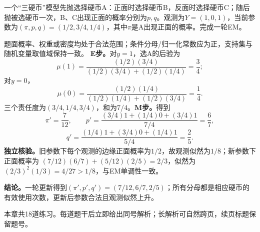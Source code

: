 \label{struct:V3-C04-CH32}
\begin{example}[三硬币模型的一轮EM]\label{exm:V3-C04-three-coins-one-round}
一个“三硬币”模型先抛选择硬币A：正面时选择硬币B，反面时选择硬币C；随后抛被选硬币一次，B、C出现正面的概率分别为$p,q$。观测为$Y=(1,0,1)$，当前参数为$(\pi,p,q)=(1/2,3/4,1/4)$，其中$\pi$是A出现正面的概率。完成一轮EM。

\label{struct:V3-C04-CH33}
\end{example}
\begin{solution}
\SolGiven 题面概率、权重或密度均处于合法范围；条件分母/归一化常数应为正，支持集与随机变量取值域保持一致。
\SolDerive
\textbf{E步。}对$y=1$，选A的后验为
\[
\mu(1)=\frac{(1/2)(3/4)}{(1/2)(3/4)+(1/2)(1/4)}=\frac34;
\]
对$y=0$，
\[
\mu(0)=\frac{(1/2)(1/4)}{(1/2)(1/4)+(1/2)(3/4)}=\frac14.
\]
三个责任度为$(3/4,1/4,3/4)$，和为$7/4$。\textbf{M步。}得到
\[
\pi'=\frac{7}{12},\qquad
p'=\frac{(3/4)1+(1/4)0+(3/4)1}{7/4}=\frac67,
\]
\[
q'=\frac{(1/4)1+(3/4)0+(1/4)1}{5/4}=\frac25.
\]
\textbf{独立核验。}旧参数下每个观测的边缘正面概率为$1/2$，故观测似然为$1/8$；新参数下正面概率为
$(7/12)(6/7)+(5/12)(2/5)=2/3$，似然为$(2/3)^2(1/3)=4/27>1/8$，与EM单调性一致。

\textbf{结论。}一轮更新得到$(\pi',p',q')=(7/12,6/7,2/5)$；所有分母都是相应硬币的有效使用次数，更新后参数合法且观测似然上升。
\end{solution}


\label{struct:V3-C04-CH34}
\begin{chapterexercisebox}
\label{struct:V3-C04-CH35}
本章共18道练习。每道题干后立即给出同号解析；长解析可自然跨页，续页标题保留题号。
\end{chapterexercisebox}

